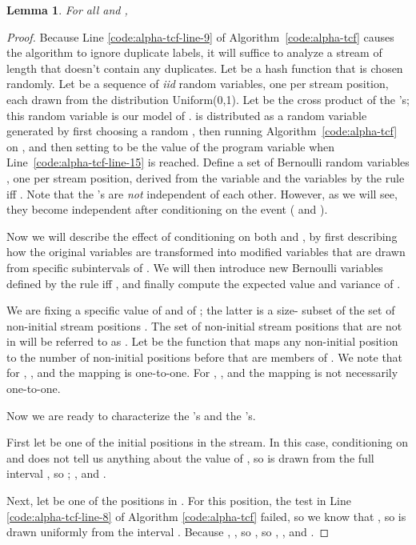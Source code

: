 \documentclass{article}
\newtheorem{lemma}[theorem]{Lemma}
\begin{document}
\begin{lemma}\label{space-lemma}
For all  and ,

\end{lemma}
\begin{proof}
Because Line \ref{code:alpha-tcf-line-9} 
of Algorithm~\ref{code:alpha-tcf} causes the algorithm to ignore duplicate labels,
it will suffice to analyze a stream  of length  that doesn't contain any
duplicates.
Let  be a hash function that is
chosen randomly. Let  be a sequence of  {\em iid}
random variables, one per stream position, each drawn from the distribution Uniform(0,1). 
Let  be the cross product of the 's; this random variable is our model of .
 is distributed as a random variable generated by first choosing a random , then running Algorithm~\ref{code:alpha-tcf} on ,
and then setting  to be the value of the program variable  when Line~\ref{code:alpha-tcf-line-15} is reached.
Define a set of  Bernoulli random variables , one
per stream position, derived from the variable  and the variables
 by the rule  iff .
Note that the 's are {\em not} independent of each other. However, as we will see, they become 
independent after conditioning on the event ( and ).

Now we will describe the effect of conditioning on both  and ,
by first describing how the original variables  are transformed
into modified variables  that are drawn from specific
subintervals of .  We will then introduce new Bernoulli
variables  defined by the rule  iff , and finally compute the expected value and variance of
.


We are fixing a specific value  of  and  of ; the latter is a size- subset of the set of 
 non-initial stream positions .
The set of  non-initial stream positions that are not in  will be 
referred to as .
Let  be the function that maps any non-initial position
 to the number of non-initial positions before  that are members of .
We note that for , , and the
mapping is one-to-one.
For , , and the mapping is not necessarily one-to-one.

Now we are ready to characterize the 's and the 's. 

First let  be one of the  initial positions in the stream.
In this case, conditioning on  and  does not tell us anything about the value of ,
so  is drawn from the full interval , so ;
, and .

Next, let  be one of the  positions in . 
For this position, the test in 
Line \ref{code:alpha-tcf-line-8} of Algorithm \ref{code:alpha-tcf}
failed, so we know that ,
so  is drawn uniformly from the interval . Because ,
, so , 
so , , and .


\end{proof}
\end{document}
